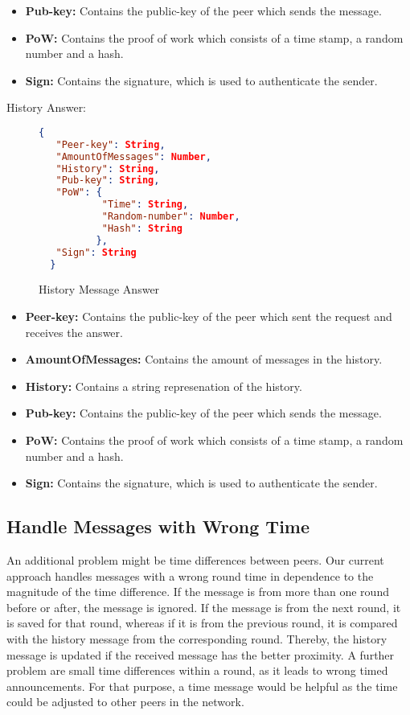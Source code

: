 \documentclass[IN,11pt,oneside,openright,english]{article}
\begin{document}
\begin{itemize}
\item \textbf{Pub-key:} Contains the public-key of the peer which sends the message.
\item \textbf{PoW:} Contains the proof of work which consists of a time stamp, a random number and a hash.
\item \textbf{Sign:} Contains the signature, which is used to authenticate the sender.
\end{itemize}

\newpage

History Answer:
\begin{figure}[!h]
  \centering
  \begin{lstlisting}[language=json,firstnumber=1]
  {
   "Peer-key": String,
   "AmountOfMessages": Number,
   "History": String,
   "Pub-key": String,
   "PoW": {
           "Time": String,
           "Random-number": Number,
           "Hash": String
          },
   "Sign": String
  }
  \end{lstlisting}
\caption{History Message Answer}
\end{figure}

\begin{itemize}
\item \textbf{Peer-key:} Contains the public-key of the peer which sent the request and receives the answer.
\item \textbf{AmountOfMessages:} Contains the amount of messages in the history.
\item \textbf{History:} Contains a string represenation of the history.
\item \textbf{Pub-key:} Contains the public-key of the peer which sends the message.
\item \textbf{PoW:} Contains the proof of work which consists of a time stamp, a random number and a hash.
\item \textbf{Sign:} Contains the signature, which is used to authenticate the sender.
\end{itemize}

\subsection{Handle Messages with Wrong Time}
An additional problem might be time differences between peers. Our current approach handles messages with a wrong round time in dependence to the magnitude of the time difference. If the message is from more than one round before or after, the message is ignored. If the message is from the next round, it is saved for that round, whereas if it is from the previous round, it is compared with the history message from the corresponding round. Thereby, the history message is updated if the received message has the better proximity. \newline
A further problem are small time differences within a round, as it leads to wrong timed announcements.
For that purpose, a time message would be helpful as the time could be adjusted to other peers in the network.
\end{document}
